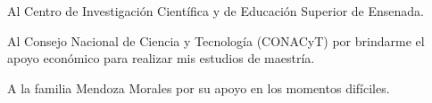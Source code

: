 
\hspace{12pt}
\bigskip

Al Centro de Investigación Científica y de Educación Superior de Ensenada.
\bigskip

Al Consejo Nacional de Ciencia y Tecnología (CONACyT) por brindarme el apoyo econ\'omico para realizar mis estudios de maestría.\\
\bigskip

A la familia Mendoza Morales por su apoyo en los momentos dif\'iciles.\\
